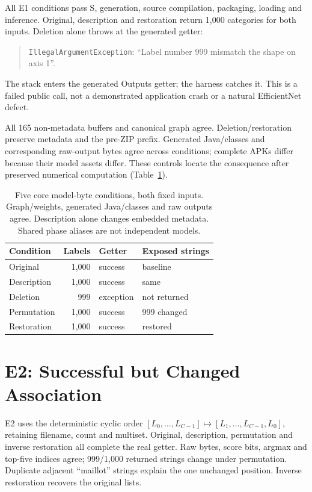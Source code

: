 \documentclass[10pt,conference]{IEEEtran}
\newcommand{\code}[1]{\texttt{#1}}
\begin{document}
All E1 conditions pass S, generation, source compilation, packaging, loading and inference. Original, description and restoration return 1,000 categories for both inputs. Deletion alone throws at the generated getter:
\begin{quote}\small\raggedright
\code{IllegalArgumentException}: ``Label number 999 mismatch the shape on axis 1''.
\end{quote}
The stack enters the generated Outputs getter; the harness catches it. This is a failed public call, not a demonstrated application crash or a natural EfficientNet defect.

All 165 non-metadata buffers and canonical graph agree. Deletion/restoration preserve metadata and the pre-ZIP prefix. Generated Java/classes and corresponding raw-output bytes agree across conditions; complete APKs differ because their model assets differ. These controls locate the consequence after preserved numerical computation (Table~\ref{tab:core}).

\begin{table}[t]
\caption{Five core model-byte conditions, both fixed inputs. Graph/weights, generated Java/classes and raw outputs agree. Description alone changes embedded metadata. Shared phase aliases are not independent models.}
\label{tab:core}
\centering\footnotesize
\begin{tabular}{@{}lrll@{}}
\toprule
Condition & Labels & Getter & Exposed strings\\
\midrule
Original & 1,000 & success & baseline\\
Description & 1,000 & success & same\\
Deletion & 999 & exception & not returned\\
Permutation & 1,000 & success & 999 changed\\
Restoration & 1,000 & success & restored\\
\bottomrule
\end{tabular}
\end{table}

\section{E2: Successful but Changed Association}
\label{sec:e2}
E2 uses the deterministic cyclic order $[L_0,\ldots,L_{C-1}]\mapsto[L_1,\ldots,L_{C-1},L_0]$, retaining filename, count and multiset. Original, description, permutation and inverse restoration all complete the real getter. Raw bytes, score bits, argmax and top-five indices agree; 999/1,000 returned strings change under permutation. Duplicate adjacent ``maillot'' strings explain the one unchanged position. Inverse restoration recovers the original lists.
\end{document}
